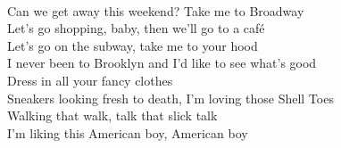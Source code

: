 \\
Can we get away this weekend? Take me to Broadway \\
Let's go shopping, baby, then we'll go to a café \\
Let's go on the subway, take me to your hood \\
I never been to Brooklyn and I'd like to see what's good \\
Dress in all your fancy clothes \\
Sneakers looking fresh to death, I'm loving those Shell Toes \\
Walking that walk, talk that slick talk \\
I'm liking this American boy, American boy
\\
